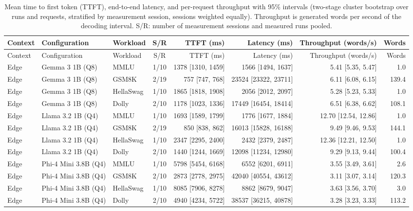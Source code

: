 \begin{longtable}{@{}l l l c r r r r@{}}
\caption{Mean time to first token (TTFT), end-to-end latency, and per-request throughput with 95\% intervals (two-stage cluster bootstrap over runs and requests, stratified by measurement session, sessions weighted equally). Throughput is generated words per second of the decoding interval. S/R: number of measurement sessions and measured runs pooled.}\label{tab:s1}\\
\toprule
Context & Configuration & Workload & S/R & TTFT (ms) & Latency (ms) & Throughput (words/s) & Words \\
\midrule\endfirsthead
\toprule
Context & Configuration & Workload & S/R & TTFT (ms) & Latency (ms) & Throughput (words/s) & Words \\
\midrule\endhead
\bottomrule\endfoot
Edge & Gemma 3 1B (Q8) & MMLU & 1/10 & 1378 [1310, 1459] & 1566 [1494, 1637] & 5.41 [5.35, 5.47] & 1.0 \\
Edge & Gemma 3 1B (Q8) & GSM8K & 2/19 & 757 [747, 768] & 23524 [23322, 23711] & 6.11 [6.08, 6.15] & 139.4 \\
Edge & Gemma 3 1B (Q8) & HellaSwag & 1/10 & 1865 [1818, 1908] & 2056 [2012, 2097] & 5.28 [5.23, 5.33] & 1.0 \\
Edge & Gemma 3 1B (Q8) & Dolly & 2/10 & 1178 [1023, 1336] & 17449 [16454, 18414] & 6.51 [6.38, 6.62] & 108.1 \\
Edge & Llama 3.2 1B (Q4) & MMLU & 1/10 & 1693 [1589, 1799] & 1776 [1677, 1884] & 12.70 [12.54, 12.86] & 1.0 \\
Edge & Llama 3.2 1B (Q4) & GSM8K & 2/19 & 850 [838, 862] & 16013 [15828, 16188] & 9.49 [9.46, 9.53] & 144.1 \\
Edge & Llama 3.2 1B (Q4) & HellaSwag & 1/10 & 2347 [2295, 2400] & 2432 [2379, 2487] & 12.36 [12.21, 12.50] & 1.0 \\
Edge & Llama 3.2 1B (Q4) & Dolly & 2/10 & 1440 [1244, 1669] & 12098 [11234, 12980] & 9.29 [9.13, 9.44] & 100.4 \\
Edge & Phi-4 Mini 3.8B (Q4) & MMLU & 1/10 & 5798 [5454, 6168] & 6552 [6201, 6911] & 3.55 [3.49, 3.61] & 2.6 \\
Edge & Phi-4 Mini 3.8B (Q4) & GSM8K & 2/10 & 2873 [2778, 2975] & 42040 [40554, 43612] & 3.11 [3.07, 3.14] & 120.3 \\
Edge & Phi-4 Mini 3.8B (Q4) & HellaSwag & 1/10 & 8085 [7906, 8278] & 8862 [8679, 9047] & 3.63 [3.56, 3.70] & 3.0 \\
Edge & Phi-4 Mini 3.8B (Q4) & Dolly & 2/10 & 4940 [4234, 5722] & 38537 [36215, 40878] & 3.28 [3.23, 3.33] & 113.2 \\

\end{longtable}
